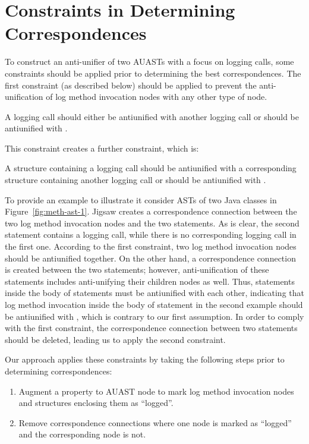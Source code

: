\section{Constraints in Determining Correspondences}  \label{meth-constraints}
To construct an anti-unifier of two AUASTs with a focus on logging calls, some constraints should be applied prior to determining the best correspondences. The first constraint (as described below) should be applied to prevent the anti-unification of log method invocation nodes with any other type of node.
\begin{constraint}
A logging call should either be antiunified with another logging call or should be antiunified with \nothing.
\end{constraint}	
	
This constraint creates a further constraint, which is:

\begin{constraint}
A structure containing a logging call should be antiunified with a corresponding structure containing another logging call or should be antiunified with \nothing.
\end{constraint}


To provide an example to illustrate it consider ASTs of two Java classes in Figure~\ref{fig:meth-ast-1}. Jigsaw creates a correspondence connection between the two log method invocation nodes and the two  statements. As is clear, the second  statement contains a logging call, while there is no corresponding logging call in the first one. According to the first constraint, two log method invocation nodes should be antiunified together. On the other hand, a correspondence connection is created between the two  statements; however, anti-unification of these statements includes anti-unifying their children nodes as well. Thus, statements inside the body of  statements must be antiunified with each other, indicating that log method invocation inside the body of  statement in the second example should be antiunified with \nothing, which is contrary to our first assumption. In order to comply with the first constraint, the correspondence connection between two  statements should be deleted, leading us to apply the second constraint.

Our approach applies these constraints by taking the following steps prior to determining correspondences:
\begin{enumerate} [leftmargin=.4in]
\item	Augment a property to AUAST node to mark log method invocation nodes and structures enclosing them as ``logged''.

\item	Remove correspondence connections where one node is marked as ``logged'' and the corresponding node is not.
\end{enumerate}


